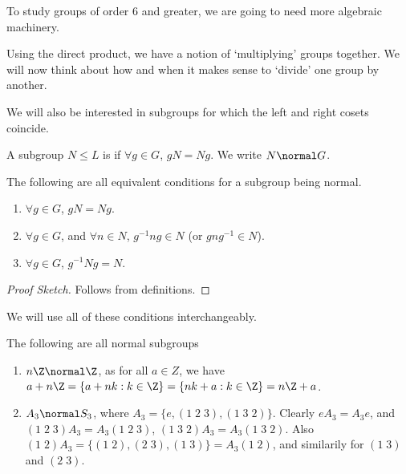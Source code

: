 To study groups of order $6$ and greater, we are going to need more algebraic machinery.
 

Using the direct product, we have a notion of `multiplying' groups together. We will now think about how and when it makes sense to `divide' one group by another. 


We will also be interested in subgroups for which the left and right cosets coincide.

\begin{definition}
	A subgroup $N \leq L$ is  if $\forall g \in G$, $gN = Ng$. We write $N \normal G$.
\end{definition}

\begin{proposition}
	The following are all equivalent conditions for a subgroup being normal.
	\begin{enumerate}[label=(\roman*)]
		\item $\forall g \in G$, $gN = Ng$.
		\item $\forall g \in G$, and $\forall n \in N$, $g^{-1} n g \in N$ (or $g n g^{-1} \in N$).
		\item $\forall g \in G$, $g^{-1} N g = N$.
	\end{enumerate}
\end{proposition}
\begin{proof}[Proof Sketch]
	Follows from definitions.
\end{proof}

We will use all of these conditions interchangeably.

\begin{example}
	The following are all normal subgroups
	\begin{enumerate}[label=(\roman*)]
		\item $n\Z \normal \Z$, as for all $a \in Z$, we have
		$a + n\Z = \{a + nk : k \in \Z\} = \{nk + a : k \in \Z\} = n\Z + a$.
		\item 
		$A_3 \normal S_3$, where $A_3 = \{e, (1\; 2\; 3), (1\; 3\; 2)\}$. Clearly $eA_3 = A_3 e$, and $(1\;2\;3)A_3 = A_3 (1\; 2\; 3)$, $(1\; 3\; 2)A_3 = A_3 (1\; 3\; 2)$. Also $(1\; 2)A_3 = \{(1\; 2), (2\; 3), (1\; 3)\} = A_3(1\; 2)$, and similarily for $(1\;3)$ and $(2\; 3)$.
	\end{enumerate}
\end{example}


